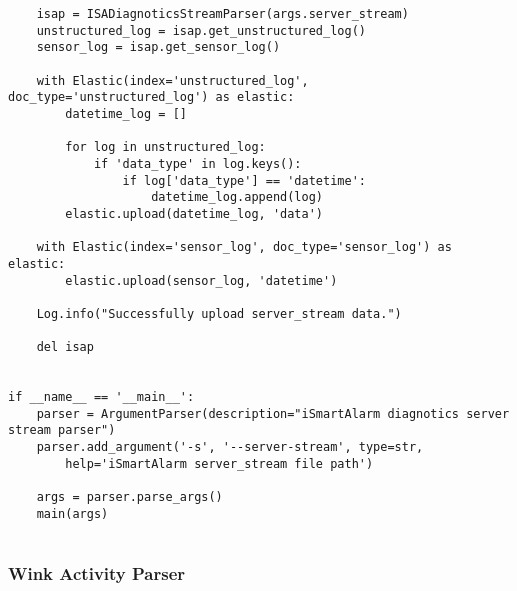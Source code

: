 \documentclass{easychair}
\begin{document}
\begin{lstlisting}
    isap = ISADiagnoticsStreamParser(args.server_stream)
    unstructured_log = isap.get_unstructured_log()
    sensor_log = isap.get_sensor_log()

    with Elastic(index='unstructured_log', doc_type='unstructured_log') as elastic:
        datetime_log = []

        for log in unstructured_log:
            if 'data_type' in log.keys():
                if log['data_type'] == 'datetime':
                    datetime_log.append(log)
        elastic.upload(datetime_log, 'data')

    with Elastic(index='sensor_log', doc_type='sensor_log') as elastic:
        elastic.upload(sensor_log, 'datetime')

    Log.info("Successfully upload server_stream data.")

    del isap


if __name__ == '__main__':
    parser = ArgumentParser(description="iSmartAlarm diagnotics server stream parser")
    parser.add_argument('-s', '--server-stream', type=str,
        help='iSmartAlarm server_stream file path')

    args = parser.parse_args()
    main(args)


\end{lstlisting}

\subsubsection{Wink Activity Parser}
\end{document}
